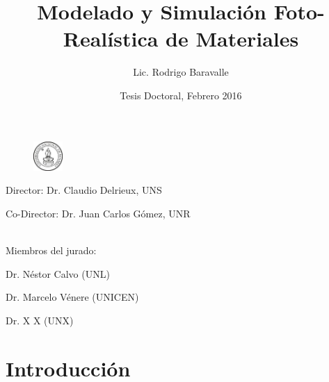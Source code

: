 \documentclass[spanish]{beamer}
\begin{document}
\title
    [Modelado Foto-Realístico de Materiales]{Modelado y Simulación Foto-Realística de Materiales}

\author[Lic. Rodrigo Baravalle]{Lic. Rodrigo Baravalle}
 



\date{Tesis Doctoral, Febrero 2016}

\begin{frame}
\begin{figure}
{\includegraphics[width=0.1\textwidth]{figures/logounr}}
\end{figure}
\vspace{-1cm}
  \titlepage
\centering
\vspace{-.7cm}
\begin{tiny}
Director: Dr. Claudio Delrieux, UNS

Co-Director: Dr. Juan Carlos Gómez, UNR

\ \\

Miembros del jurado:

Dr. Néstor Calvo (UNL)

Dr. Marcelo Vénere (UNICEN)

Dr. X X (UNX)

\end{tiny}

\end{frame}

\section{Introducción}
\end{document}
